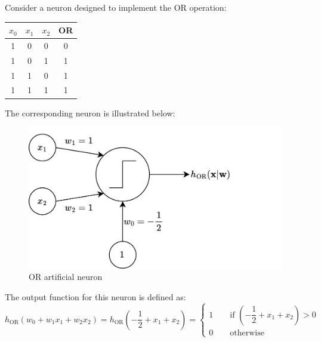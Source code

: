 \begin{example}
    Consider a neuron designed to implement the OR operation:
    \begin{table}[H]
        \centering
        \begin{tabular}{ccc|c}
        $x_0$ & $x_1$ & $x_2$ & \textbf{OR} \\ \hline
        1     & 0     & 0     & 0           \\
        1     & 0     & 1     & 1           \\
        1     & 1     & 0     & 1           \\
        1     & 1     & 1     & 1          
        \end{tabular}
    \end{table}
    The corresponding neuron is illustrated below:
    \begin{figure}[H]
        \centering
        \includegraphics[width=0.5\linewidth]{images/or.png}
        \caption{OR artificial neuron}
    \end{figure}
    The output function for this neuron is defined as:
    \[h_{\text{OR}}(w_0+w_1x_1+w_2x_2)=h_{\text{OR}}\left(-\dfrac{1}{2}+x_1+x_2\right)=\begin{cases} 1\qquad\text{if }\left(-\dfrac{1}{2}+x_1+x_2\right)>0 \\ 0\qquad\text{otherwise} \end{cases}\]


\end{example}

